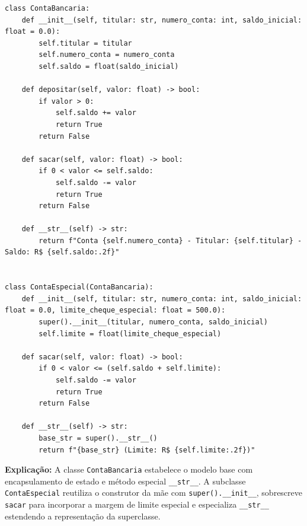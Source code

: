 \ifmostrarGabarito
\begin{verbatim}
class ContaBancaria:
    def __init__(self, titular: str, numero_conta: int, saldo_inicial: float = 0.0):
        self.titular = titular
        self.numero_conta = numero_conta
        self.saldo = float(saldo_inicial)
        
    def depositar(self, valor: float) -> bool:
        if valor > 0:
            self.saldo += valor
            return True
        return False
        
    def sacar(self, valor: float) -> bool:
        if 0 < valor <= self.saldo:
            self.saldo -= valor
            return True
        return False
        
    def __str__(self) -> str:
        return f"Conta {self.numero_conta} - Titular: {self.titular} - Saldo: R$ {self.saldo:.2f}"


class ContaEspecial(ContaBancaria):
    def __init__(self, titular: str, numero_conta: int, saldo_inicial: float = 0.0, limite_cheque_especial: float = 500.0):
        super().__init__(titular, numero_conta, saldo_inicial)
        self.limite = float(limite_cheque_especial)
        
    def sacar(self, valor: float) -> bool:
        if 0 < valor <= (self.saldo + self.limite):
            self.saldo -= valor
            return True
        return False
        
    def __str__(self) -> str:
        base_str = super().__str__()
        return f"{base_str} (Limite: R$ {self.limite:.2f})"
\end{verbatim}

\textbf{Explicação:}
A classe \texttt{ContaBancaria} estabelece o modelo base com encapsulamento de estado e método especial \texttt{\_\_str\_\_}. A subclasse \texttt{ContaEspecial} reutiliza o construtor da mãe com \texttt{super().\_\_init\_\_}, sobrescreve \texttt{sacar} para incorporar a margem de limite especial e especializa \texttt{\_\_str\_\_} estendendo a representação da superclasse.
\else
{}
\clearpage
{}
\clearpage
\fi
